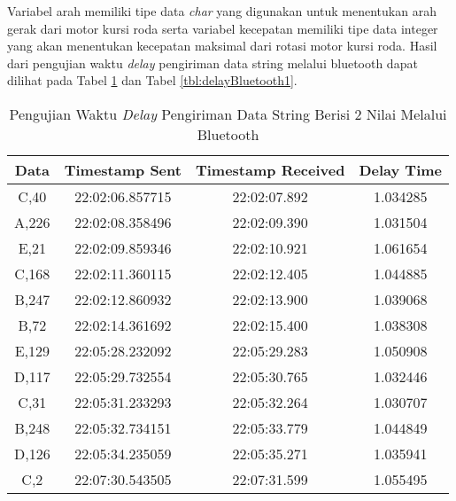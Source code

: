 Variabel arah memiliki tipe data \emph{char} yang digunakan untuk menentukan arah gerak dari motor kursi roda serta variabel kecepatan memiliki tipe data integer yang akan menentukan kecepatan maksimal dari rotasi motor kursi roda. Hasil dari pengujian waktu \emph{delay} pengiriman data string melalui bluetooth dapat dilihat pada Tabel \ref{tbl:delayBluetooth} dan Tabel \ref{tbl:delayBluetooth1}.
\begin{longtable}{|ccc|c|}
  \caption{Pengujian Waktu \emph{Delay} Pengiriman Data String Berisi 2 Nilai Melalui Bluetooth}
  \label{tbl:delayBluetooth}\\
    \hline
    \multicolumn{1}{|c|}{Data}  & \multicolumn{1}{c|}{Timestamp Sent}  & Timestamp Received & Delay Time  \\ \hline
    \endfirsthead
    \endhead
    \multicolumn{1}{|c|}{C,40}  & \multicolumn{1}{c|}{22:02:06.857715} & 22:02:07.892       & 1.034285    \\ \hline
    \multicolumn{1}{|c|}{A,226} & \multicolumn{1}{c|}{22:02:08.358496} & 22:02:09.390       & 1.031504    \\ \hline
    \multicolumn{1}{|c|}{E,21}  & \multicolumn{1}{c|}{22:02:09.859346} & 22:02:10.921       & 1.061654    \\ \hline
    \multicolumn{1}{|c|}{C,168} & \multicolumn{1}{c|}{22:02:11.360115} & 22:02:12.405       & 1.044885    \\ \hline
    \multicolumn{1}{|c|}{B,247} & \multicolumn{1}{c|}{22:02:12.860932} & 22:02:13.900       & 1.039068    \\ \hline
    \multicolumn{1}{|c|}{B,72}  & \multicolumn{1}{c|}{22:02:14.361692} & 22:02:15.400       & 1.038308    \\ \hline
    \multicolumn{1}{|c|}{E,129} & \multicolumn{1}{c|}{22:05:28.232092} & 22:05:29.283       & 1.050908    \\ \hline
    \multicolumn{1}{|c|}{D,117} & \multicolumn{1}{c|}{22:05:29.732554} & 22:05:30.765       & 1.032446    \\ \hline
    \multicolumn{1}{|c|}{C,31}  & \multicolumn{1}{c|}{22:05:31.233293} & 22:05:32.264       & 1.030707    \\ \hline
    \multicolumn{1}{|c|}{B,248} & \multicolumn{1}{c|}{22:05:32.734151} & 22:05:33.779       & 1.044849    \\ \hline
    \multicolumn{1}{|c|}{D,126} & \multicolumn{1}{c|}{22:05:34.235059} & 22:05:35.271       & 1.035941    \\ \hline
    \multicolumn{1}{|c|}{C,2}   & \multicolumn{1}{c|}{22:07:30.543505} & 22:07:31.599       & 1.055495    \\ \hline

\end{longtable}
